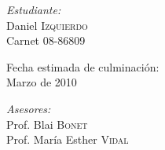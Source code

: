 \begin{titlepage}
\begin{minipage}{0.3\textwidth}
\begin{flushleft}
\emph{Estudiante:} \\
Daniel \textsc{Izquierdo} \\
Carnet 08-86809 \\
\end{flushleft}
\end{minipage}
\begin{minipage}{0.3\textwidth}
\begin{center}
Fecha estimada de culminación: \\
Marzo de 2010
\end{center}
\end{minipage}
\begin{minipage}{0.3\textwidth}
\begin{flushright}
\emph{Asesores:} \\
Prof. Blai \textsc{Bonet} \\
Prof. María Esther \textsc{Vidal} \\
\end{flushright}
\end{minipage}

\end{titlepage}
